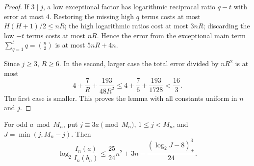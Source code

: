 \begin{proof}
If $3\mid j$, a low exceptional factor has logarithmic
reciprocal ratio $q-t$ with error at most 4.  Restoring the
missing high $q$ terms costs at most $H(H+1)/2\le nR$;
the high logarithmic ratios cost at most $3nR$; discarding
the low $-t$ terms costs at most $nR$.  Hence the error from
the exceptional main term $\sum_{q=1}^lq=\binom n2$ is at
most $5nR+4n$.

Since $j\ge3$, $R\ge6$.  In the second, larger case the total
error divided by $nR^2$ is at most
\[
                4+\frac7R+\frac{193}{48R^2}
       \le4+\frac76+\frac{193}{1728}<\frac{16}{3}.
\]
The first case is smaller.  This proves the lemma with all
constants uniform in $n$ and $j$.
\end{proof}

\begin{lemma}
For odd $a\bmod M_n$, put $j\equiv3a\pmod{M_n}$,
$1\le j<M_n$, and $J=\min(j,M_n-j)$.  Then
\[
 \log_2\frac{I_n(a)}{I_n(b_n)}
       \le \frac{25}{24}n^2+3n-\frac{(\log_2J-8)_+^3}{24}.
 \tag{PNEW-far}
\]
\end{lemma}
